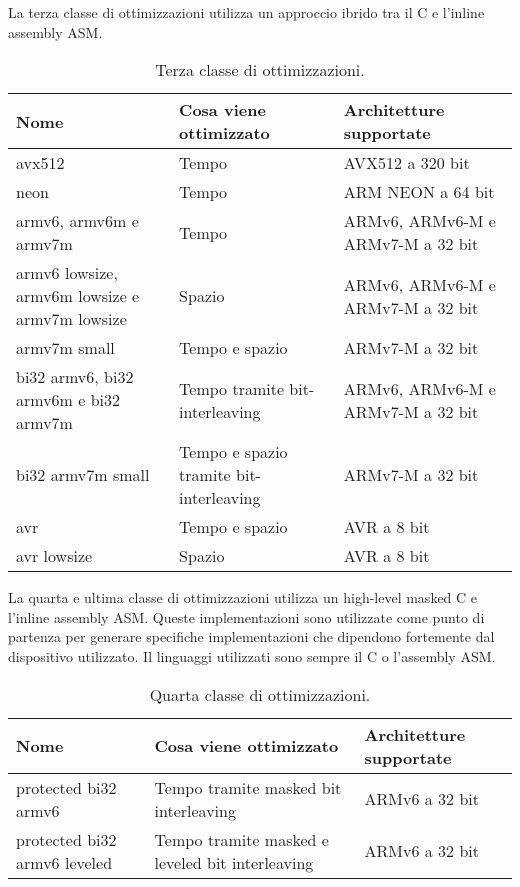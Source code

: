 \noindent La terza classe di ottimizzazioni utilizza un approccio ibrido tra il C e l'inline assembly ASM\cite{github}.

\begin{table}[H]
    \centering
	\begin{tabular}{|m{}<{\centering}||m{}<{\centering}|m{}<{\centering}|}
		\hline
		\textbf{Nome} & \textbf{Cosa viene ottimizzato} & \textbf{Architetture supportate} \\
        \hline \hline
        avx512 & Tempo & AVX512 a 320 bit \\
        \hline
        neon & Tempo & ARM NEON a 64 bit \\
        \hline
        armv6, armv6m e armv7m & Tempo & ARMv6, ARMv6-M e ARMv7-M a 32 bit \\
        \hline
        armv6 lowsize, armv6m lowsize e armv7m lowsize & Spazio & ARMv6, ARMv6-M e ARMv7-M a 32 bit \\
        \hline
        armv7m small & Tempo e spazio & ARMv7-M a 32 bit \\
        \hline
        bi32 armv6, bi32 armv6m e bi32 armv7m & Tempo tramite bit-interleaving & ARMv6, ARMv6-M e ARMv7-M a 32 bit \\
        \hline
        bi32 armv7m small & Tempo e spazio tramite bit-interleaving & ARMv7-M a 32 bit \\
        \hline
        avr & Tempo e spazio & AVR a 8 bit \\
        \hline
        avr lowsize & Spazio & AVR a 8 bit \\
        \hline
    \end{tabular}
    \caption{Terza classe di ottimizzazioni.}
\end{table}

\noindent La quarta e ultima classe di ottimizzazioni utilizza un high-level masked C e l'inline assembly ASM\cite{github}. Queste implementazioni sono utilizzate come punto di partenza per generare specifiche implementazioni che dipendono fortemente dal dispositivo utilizzato. Il linguaggi utilizzati sono sempre il C o l'assembly ASM.

\begin{table}[H]
    \centering
	\begin{tabular}{|m{}<{\centering}||m{}<{\centering}|m{}<{\centering}|}
		\hline
		\textbf{Nome} & \textbf{Cosa viene ottimizzato} & \textbf{Architetture supportate} \\
        \hline \hline
        protected bi32 armv6 & Tempo tramite masked bit interleaving & ARMv6 a 32 bit \\
        \hline
        protected bi32 armv6 leveled & Tempo tramite masked e leveled bit interleaving & ARMv6 a 32 bit \\
        \hline
    \end{tabular}
    \caption{Quarta classe di ottimizzazioni.}
\end{table}
